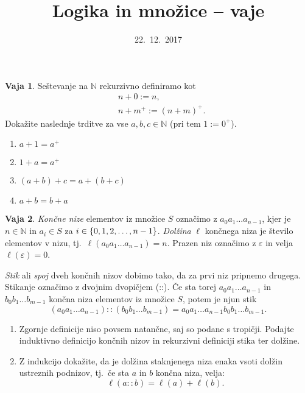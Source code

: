 \documentclass{article}
\newcommand{\NN}{\mathbb{N}}
\theoremstyle{definition}
\newtheorem{vaja}{Vaja}
\begin{document}
\title{Logika in množice -- vaje}
\date{22.~12.~2017}
\maketitle

\begin{vaja}
  Seštevanje na $\NN$ rekurzivno definiramo kot
  \begin{align*}
    &n + 0 := n, \\
    &n + m^+ := (n + m)^+.
  \end{align*}
  Dokažite naslednje trditve za vse $a, b, c \in \NN$ (pri tem $1 := 0^+$).
  \begin{enumerate}
    \item
      $a + 1 = a^+$
    \item
      $1 + a = a^+$
    \item
      $(a + b) + c = a + (b + c)$
    \item
      $a + b = b + a$
  \end{enumerate}
\end{vaja}

\begin{vaja}
	\emph{Končne nize} elementov iz množice $S$ označimo z $a_0 a_1 \ldots a_{n-1}$, kjer je $n \in \NN$ in $a_i \in S$ za $i \in \set{0, 1, 2, \ldots, n-1}$. \emph{Dolžina} $\ell$ končnega niza je število elementov v nizu, tj.~$\ell(a_0 a_1 \ldots a_{n-1}) = n$. Prazen niz označimo z $\varepsilon$ in velja $\ell(\varepsilon) = 0$.
	
	\emph{Stik} ali \emph{spoj} dveh končnih nizov dobimo tako, da za prvi niz pripnemo drugega. Stikanje označimo z dvojnim dvopičjem (::). Če sta torej $a_0 a_1 \ldots a_{n-1}$ in $b_0 b_1 \ldots b_{m-1}$ končna niza elementov iz množice $S$, potem je njun stik
	\[(a_0 a_1 \ldots a_{n-1}) :: (b_0 b_1 \ldots b_{m-1}) = a_0 a_1 \ldots a_{n-1} b_0 b_1 \ldots b_{m-1}.\]
	\begin{enumerate}
		\item
			Zgornje definicije niso povsem natančne, saj so podane s tropičji. Podajte induktivno definicijo končnih nizov in rekurzivni definiciji stika ter dolžine.
		\item
			Z indukcijo dokažite, da je dolžina staknjenega niza enaka vsoti dolžin ustreznih podnizov, tj.~če sta $a$ in $b$ končna niza, velja:
			\[\ell(a :: b) = \ell(a) + \ell(b).\]
	\end{enumerate}
\end{vaja}
\end{document}
